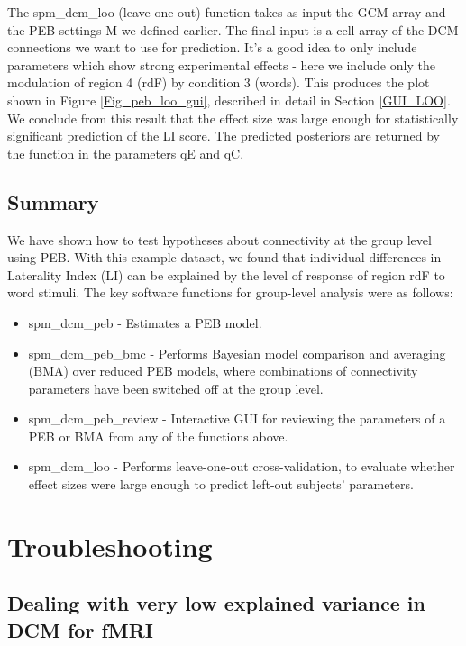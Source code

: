 \documentclass{article}
\begin{document}
The spm\_dcm\_loo (leave-one-out) function takes as input the GCM array and the PEB settings M we defined earlier. The final input is a cell array of the DCM connections we want to use for prediction. It's a good idea to only include parameters which show strong experimental effects - here we include only the modulation of region 4 (rdF) by condition 3 (words). This produces the plot shown in Figure \ref{Fig_peb_loo_gui}, described in detail in Section \ref{GUI_LOO}. We conclude from this result that the effect size was large enough for statistically significant prediction of the LI score. The predicted posteriors are returned by the function in the parameters qE and qC.

\subsection{Summary}

We have shown how to test hypotheses about connectivity at the group level using PEB. With this example dataset, we found that individual differences in Laterality Index (LI) can be explained by the level of response of region rdF to word stimuli. The key software functions for group-level analysis were as follows:

\begin{itemize}
    \item spm\_dcm\_peb - Estimates a PEB model.
    \item spm\_dcm\_peb\_bmc - Performs Bayesian model comparison and averaging (BMA) over reduced PEB models, where combinations of connectivity parameters have been switched off at the group level.
    \item spm\_dcm\_peb\_review - Interactive GUI for reviewing the parameters of a PEB or BMA from any of the functions above.
    \item spm\_dcm\_loo - Performs leave-one-out cross-validation, to evaluate whether effect sizes were large enough to predict left-out subjects' parameters.
\end{itemize}

\section{Troubleshooting} \label{troubleshooting}

\subsection{Dealing with very low explained variance in DCM for fMRI}
\end{document}
